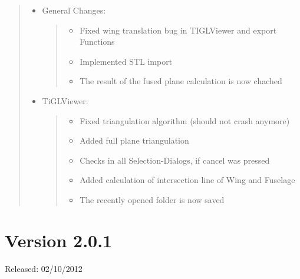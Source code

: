 \documentclass[]{scrartcl}
\begin{document}
\begin{quote}
\begin{itemize}
\item
  General Changes:

  \begin{quote}
  \begin{itemize}
  \itemsep1pt\parskip0pt
  \item
    Fixed wing translation bug in TIGLViewer and export Functions
  \item
    Implemented STL import
  \item
    The result of the fused plane calculation is now chached
  \end{itemize}
  \end{quote}
\item
  TiGLViewer:

  \begin{quote}
  \begin{itemize}
  \itemsep1pt\parskip0pt
  \item
    Fixed triangulation algorithm (should not crash anymore)
  \item
    Added full plane triangulation
  \item
    Checks in all Selection-Dialogs, if cancel was pressed
  \item
    Added calculation of intersection line of Wing and Fuselage
  \item
    The recently opened folder is now saved
  \end{itemize}
  \end{quote}
\end{itemize}
\end{quote}

\section{Version 2.0.1}\label{version-2.0.1}

Released: 02/10/2012
\end{document}
